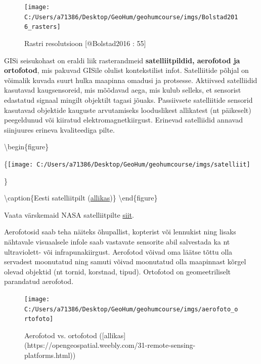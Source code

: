 \documentclass[
]{book}
\begin{document}
\begin{figure}

{\centering \texttt{[image: C:/Users/a71386/Desktop/GeoHum/geohumcourse/imgs/Bolstad2016\_rasters]} 

}

\caption{Rastri resolutsioon [@Bolstad2016 : 55]}\label{fig:unnamed-chunk-2}
\end{figure}

GISi seisukohast on eraldi liik rasterandmeid \textbf{satelliitpildid, aerofotod ja ortofotod}, mis pakuvad GISile olulist kontekstilist infot.
Satelliitide põhjal on võimalik kuvada suurt hulka maapinna omadusi ja protsesse. Aktiivsed satelliidid kasutavad kaugsensoreid, mis mõõdavad aega, mis kulub selleks, et sensorist edastatud signaal mingilt objektilt tagasi jõuaks. Passiivsete satelliitide sensorid kasutavad objektide kauguste arvutamiseks looduslikest allikatest (nt päikeselt) peegeldunud või kiiratud elektromagnetkiirgust. Erinevad satelliidid annavad siinjuures erineva kvaliteediga pilte.

\textbackslash begin\{figure\}

\{\centering \texttt{[image: C:/Users/a71386/Desktop/GeoHum/geohumcourse/imgs/satelliit]}

\}

\textbackslash caption\{Eesti satelliitpilt (\href{https://commons.wikimedia.org/wiki/File:Satellite_image_of_Estonia_in_April_2004.jpg}{allikas})\}\label{fig:satelliit}
\textbackslash end\{figure\}

Vaata värskemaid NASA satelliitpilte \href{https://wvs.earthdata.nasa.gov/?COORDINATES=55.0171,17.8288,61.4922,35.0957}{siit}.

Aerofotosid saab teha näiteks õhupallist, kopterist või lennukist ning lisaks nähtavale visuaalsele infole saab vastavate sensorite abil salvestada ka nt ultraviolett- või infrapunakiirgust. Aerofotod võivad oma läätse tõttu olla servadest moonutatud ning samuti võivad moonutatud olla maapinnast kõrgel olevad objektid (nt tornid, korstnad, tipud). Ortofotod on geomeetriliselt parandatud aerofotod.

\begin{figure}

{\centering \texttt{[image: C:/Users/a71386/Desktop/GeoHum/geohumcourse/imgs/aerofoto\_ortofoto]} 

}

\caption{Aerofotod vs. ortofotod ([allikas](https://opengeospatial.weebly.com/31-remote-sensing-platforms.html))}\label{fig:aero-orto}
\end{figure}
\end{document}
